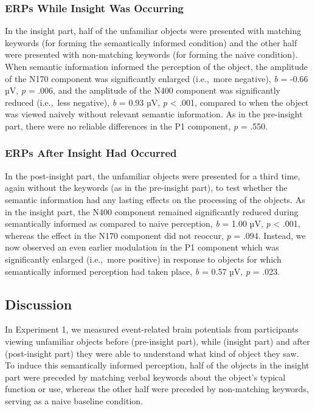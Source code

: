 \documentclass[
  english,
  doc,12pt,twoside,floatsintext]{apa7}
\begin{document}
\hypertarget{erps-while-insight-was-occurring}{%
\subsubsection{ERPs While Insight Was Occurring}\label{erps-while-insight-was-occurring}}

In the insight part, half of the unfamiliar objects were presented with matching keywords (for forming the semantically informed condition) and the other half were presented with non-matching keywords (for forming the naive condition). When semantic information informed the perception of the object, the amplitude of the N170 component was significantly enlarged (i.e.,~more negative), \emph{b} = -0.66 µV, \emph{p} = .006, and the amplitude of the N400 component was significantly reduced (i.e.,~less negative), \emph{b} = 0.93 µV, \emph{p} \textless{} .001, compared to when the object was viewed naively without relevant semantic information. As in the pre-insight part, there were no reliable differences in the P1 component, \emph{p} = .550.

\hypertarget{erps-after-insight-had-occurred}{%
\subsubsection{ERPs After Insight Had Occurred}\label{erps-after-insight-had-occurred}}

In the post-insight part, the unfamiliar objects were presented for a third time, again without the keywords (as in the pre-insight part), to test whether the semantic information had any lasting effects on the processing of the objects. As in the insight part, the N400 component remained significantly reduced during semantically informed as compared to naive perception, \emph{b} = 1.00 µV, \emph{p} \textless{} .001, whereas the effect in the N170 component did not reoccur, \emph{p} = .094. Instead, we now observed an even earlier modulation in the P1 component which was significantly enlarged (i.e.,~more positive) in response to objects for which semantically informed perception had taken place, \emph{b} = 0.57 µV, \emph{p} = .023.

\hypertarget{discussion}{%
\subsection{Discussion}\label{discussion}}

In Experiment 1, we measured event-related brain potentials from participants viewing unfamiliar objects before (pre-insight part), while (insight part) and after (post-insight part) they were able to understand what kind of object they saw. To induce this semantically informed perception, half of the objects in the insight part were preceded by matching verbal keywords about the object's typical function or use, whereas the other half were preceded by non-matching keywords, serving as a naive baseline condition.
\end{document}
